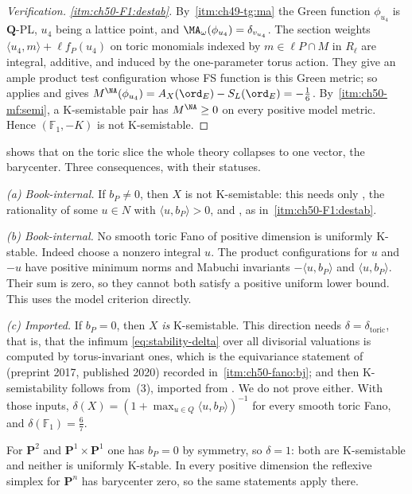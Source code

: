 \begin{proof}[Verification]
\emph{\cref{itm:ch50-F1:destab}.}  By
\,\cref{itm:ch49-tg:ma} the Green function
$\phi_{u_4}$ is $\mathbf Q$-PL, $u_4$ being a lattice point, and
$\MA_\omega(\phi_{u_4})=\delta_{v_{u_4}}$.  The section weights
$\langle u_4,m\rangle+\ell f_P(u_4)$ on toric monomials indexed by
$m\in\ell P\cap M$ in $R_\ell$ are integral,
additive, and induced by the one-parameter torus action.  They give an
ample product test configuration whose FS function is this Green metric;
so  applies and
gives $M^{\NA}(\phi_{u_4})=A_X(\ord_E)-S_L(\ord_E)=-\tfrac16$.  By
\,\cref{itm:ch50-mf:semi}, a K-semistable pair
has $M^{\NA}\ge0$ on every positive model metric.  Hence
$(\mathbb F_1,-K)$ is not K-semistable.
\end{proof}

\begin{remark}
\label{rem:ch50-toric-picture}
 shows that on the toric slice the whole theory
collapses to one vector, the barycenter.  Three consequences, with their
statuses.

\emph{(a) Book-internal.}  If $b_P\ne0$, then $X$ is not K-semistable:
this needs only , the rationality of some
$u\in N$ with $\langle u,b_P\rangle>0$, and
, as in
\,\cref{itm:ch50-F1:destab}.

\emph{(b) Book-internal.}  No smooth toric Fano of positive dimension is uniformly
K-stable.  Indeed choose a nonzero integral $u$.  The product configurations
for $u$ and $-u$ have positive minimum norms and Mabuchi invariants
$-\langle u,b_P\rangle$ and $\langle u,b_P\rangle$.
Their sum is zero, so they cannot both satisfy a positive uniform
lower bound.  This uses the model criterion directly.

\emph{(c) Imported.}  If $b_P=0$, then $X$ \emph{is} K-semistable.
This direction needs $\delta=\delta_{\mathrm{toric}}$, that is, that the
infimum \eqref{eq:stability-delta} over all divisorial valuations is
computed by torus-invariant ones, which is the equivariance statement of
\cite{BJ20} (preprint 2017, published 2020) recorded in
\,\cref{itm:ch50-fano:bj}; and then
K-semistability follows from
\,(3), imported from
\cite{Fuj19,Li17}.  We do not prove either.  With those inputs,
$\delta(X)=(1+\max_{u\in Q}\langle u,b_P\rangle)^{-1}$ for every smooth
toric Fano, and $\delta(\mathbb F_1)=\tfrac67$.

For $\mathbf P^2$ and $\mathbf P^1\times\mathbf P^1$ one has
$b_P=0$ by symmetry, so $\delta=1$: both are K-semistable and neither is uniformly K-stable.  In every positive
dimension the reflexive simplex for $\mathbf P^n$ has barycenter zero,
so the same statements apply there.
\end{remark}

